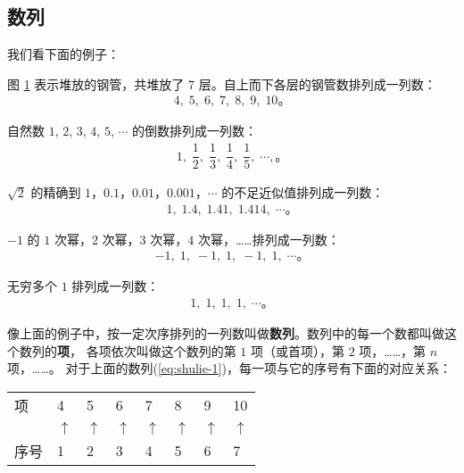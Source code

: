 \subsection{数列}\label{subsec:2-1}

我们看下面的例子：

图 \ref{fig:2-1} 表示堆放的钢管，共堆放了 7 层。自上而下各层的钢管数排列成一列数：
\begin{gather}
    4,\; 5,\; 6,\; 7,\; 8,\; 9,\; 10 \text{。} \tag{$1$}\label{eq:shulie-1}
\end{gather}

\begin{figure}[htbp]
    \centering
    
    \caption{}\label{fig:2-1}
\end{figure}

自然数 $1$, $2$, $3$, $4$, $5$, $\cdots$ 的倒数排列成一列数：
\begin{gather}
    1,\; \dfrac{1}{2},\; \dfrac{1}{3},\; \dfrac{1}{4},\; \dfrac{1}{5},\; \cdots, \text{。}  \tag{$2$}\label{eq:shulie-2}
\end{gather}

$\sqrt{2}$ 的精确到 $1$，$0.1$，$0.01$，$0.001$，$\cdots$ 的不足近似值排列成一列数：
\begin{gather}
    1,\; 1.4,\; 1.41,\; 1.414,\; \cdots \text{。} \tag{$3$}\label{eq:shulie-3}
\end{gather}

$-1$ 的 $1$ 次幂，$2$ 次幂，$3$ 次幂，$4$ 次幂，……排列成一列数：
\begin{gather}
    -1,\; 1,\; -1,\; 1,\; -1,\; 1,\; \cdots \text{。} \tag{$4$}\label{eq:shulie-4}
\end{gather}

无穷多个 $1$ 排列成一列数：
\begin{gather}
    1,\; 1,\; 1,\; 1,\; \cdots \text{。}  \tag{$5$}\label{eq:shulie-5}
\end{gather}

像上面的例子中，按一定次序排列的一列数叫做\textbf{数列}。数列中的每一个数都叫做这个数列的\textbf{项}，
各项依次叫做这个数列的第 $1$ 项（或首项），第 $2$ 项，……，第 $n$ 项，……。
对于上面的数列(\ref{eq:shulie-1})，每一项与它的序号有下面的对应关系：

\vspace{-1em}
\begin{table}[H]
    \centering
    \begin{tabular}{w{c}{5em}*{7}{w{c}{2em}}}
        项 & 4 & 5 & 6 & 7 & 8 & 9 & 10 \\
         & $\uparrow$ & $\uparrow$ & $\uparrow$ & $\uparrow$ & $\uparrow$ & $\uparrow$ & $\uparrow$ \\
        序号 & 1 & 2 & 3 & 4 & 5 & 6 & 7 \\
    \end{tabular}
\end{table}

